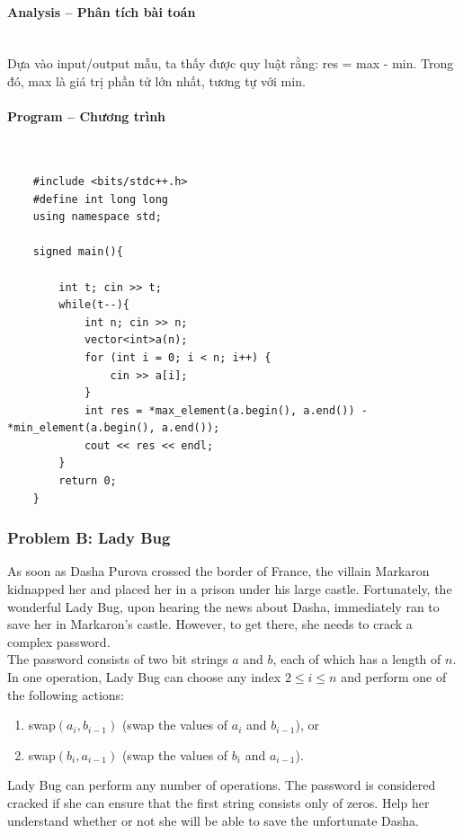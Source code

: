 \documentclass{article}
\begin{document}
\paragraph{Analysis -- Phân tích bài toán} \mbox{} \\

Dựa vào input/output mẫu, ta thấy được quy luật rằng: res = max - min. Trong đó, max là giá trị phần tử lớn nhất, tương tự với min.


\paragraph{Program -- Chương trình} \mbox{} \\

\begin{lstlisting}
	#include <bits/stdc++.h>
	#define int long long
	using namespace std;
	
	signed main(){
	
		int t; cin >> t;
		while(t--){
			int n; cin >> n;
			vector<int>a(n);
			for (int i = 0; i < n; i++) {
				cin >> a[i];
			}
			int res = *max_element(a.begin(), a.end()) - *min_element(a.begin(), a.end());
			cout << res << endl;
		}
		return 0;
	}
\end{lstlisting}

\subsubsection{Problem B: Lady Bug}

As soon as Dasha Purova crossed the border of France, the villain Markaron kidnapped her and placed her in a prison under his large castle. Fortunately, the wonderful Lady Bug, upon hearing the news about Dasha, immediately ran to save her in Markaron's castle. However, to get there, she needs to crack a complex password.\\

The password consists of two bit strings $a$ and $b$, each of which has a length of $n$. In one operation, Lady Bug can choose any index $2 \le i \le n$ and perform one of the following actions:
\begin{enumerate}
    \item swap$(a_i, b_{i-1})$ (swap the values of $a_i$ and $b_{i-1}$), or
    \item swap$(b_i, a_{i-1})$ (swap the values of $b_i$ and $a_{i-1}$).
\end{enumerate}

Lady Bug can perform any number of operations. The password is considered cracked if she can ensure that the first string consists only of zeros. Help her understand whether or not she will be able to save the unfortunate Dasha.
\end{document}
